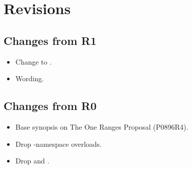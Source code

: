 \section{Revisions}

\subsection{Changes from R1}

\begin{itemize}
  \item Change  to .
  \item Wording.
\end{itemize}

\subsection{Changes from R0}

\begin{itemize}
  \item Base synopsis on The One Ranges Proposal (P0896R4).
  \item Drop -namespace overloads.
  \item Drop  and .
\end{itemize}
